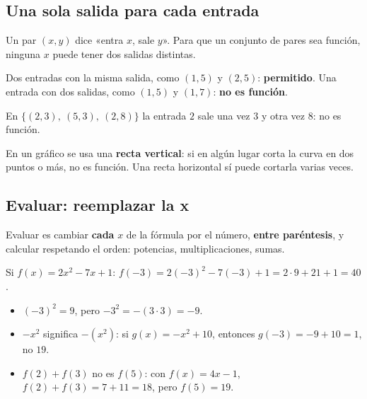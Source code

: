 \subsection{Una sola salida para cada entrada}
Un par $(x, y)$ dice «entra $x$, sale $y$». Para que un conjunto de pares sea función, ninguna $x$ puede tener dos salidas distintas.
\begin{clave} Dos entradas con la misma salida, como $(1, 5)$ y $(2, 5)$: \textbf{permitido}. Una entrada con dos salidas, como $(1, 5)$ y $(1, 7)$: \textbf{no es función}.\end{clave}
\begin{ejemplo} En $\{(2, 3),\ (5, 3),\ (2, 8)\}$ la entrada $2$ sale una vez $3$ y otra vez $8$: no es función.\end{ejemplo}
En un gráfico se usa una \textbf{recta vertical}: si en algún lugar corta la curva en dos puntos o más, no es función. Una recta horizontal sí puede cortarla varias veces.

\subsection{Evaluar: reemplazar la x}
Evaluar es cambiar \textbf{cada} $x$ de la fórmula por el número, \textbf{entre paréntesis}, y calcular respetando el orden: potencias, multiplicaciones, sumas.
\begin{ejemplo} Si $f(x) = 2x^2 - 7x + 1$:
$f(-3) = 2(-3)^2 - 7(-3) + 1 = 2\cdot 9 + 21 + 1 = 40$.\end{ejemplo}
\begin{ojo}
\begin{itemize}
  \item $(-3)^2 = 9$, pero $-3^2 = -(3\cdot 3) = -9$.
  \item $-x^2$ significa $-(x^2)$: si $g(x) = -x^2 + 10$, entonces $g(-3) = -9 + 10 = 1$, no $19$.
  \item $f(2) + f(3)$ no es $f(5)$: con $f(x) = 4x - 1$, $f(2) + f(3) = 7 + 11 = 18$, pero $f(5) = 19$.
\end{itemize}
\end{ojo}

